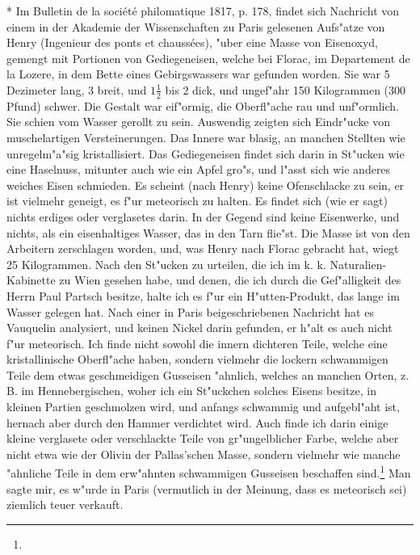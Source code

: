 \documentclass[a4paper, 11pt, oneside, polutonikogreek, german]{article}
\begin{document}
* Im Bulletin de la société philomatique 1817, p. 178, findet sich Nachricht von einem in der Akademie der Wissenschaften zu Paris gelesenen Aufs"atze von Henry (Ingenieur des ponts et chaussées), "uber eine Masse von Eisenoxyd, gemengt mit Portionen von Gediegeneisen, welche bei Florac, im Departement de la Lozere, in dem Bette eines Gebirgswassers war gefunden worden. Sie war 5 Dezimeter lang, 3 breit, und $\mathfrak{1\frac{1}{2}}$ bis 2 dick, und ungef"ahr 150 Kilogrammen (300 Pfund) schwer. Die Gestalt war eif"ormig, die Oberfl"ache rau und unf"ormlich. Sie schien vom Wasser gerollt zu sein. Auswendig zeigten sich Eindr"ucke von muschelartigen Versteinerungen. Das Innere war blasig, an manchen Stellten wie unregelm"a"sig kristallisiert. Das Gediegeneisen findet sich darin in St"ucken wie eine Haselnuss, mitunter auch wie ein Apfel gro"s, und l"asst sich wie anderes weiches Eisen schmieden. Es scheint (nach Henry) keine Ofenschlacke zu sein, er ist vielmehr geneigt, es f"ur meteorisch zu halten. Es findet sich (wie er sagt) nichts erdiges oder verglasetes darin. In der Gegend sind keine Eisenwerke, und nichts, als ein eisenhaltiges Wasser, das in den Tarn flie"st. Die Masse ist von den Arbeitern zerschlagen worden, und, was Henry nach Florac gebracht hat, wiegt 25 Kilogrammen. Nach den St"ucken zu urteilen, die ich im k. k. Naturalien-Kabinette zu Wien gesehen habe, und denen, die ich durch die Gef"alligkeit des Herrn Paul Partsch besitze, halte ich es f"ur ein H"utten-Produkt, das lange im Wasser gelegen hat. Nach einer in Paris beigeschriebenen Nachricht hat es Vauquelin analysiert, und keinen Nickel darin gefunden, er h"alt es auch nicht f"ur meteorisch. Ich finde nicht sowohl die innern dichteren Teile, welche eine kristallinische Oberfl"ache haben, sondern vielmehr die lockern schwammigen Teile dem etwas geschmeidigen Gusseisen "ahnlich, welches an manchen Orten, z. B. im Hennebergischen, woher ich ein St"uckchen solches Eisens besitze, in kleinen Partien geschmolzen wird, und anfangs schwammig und aufgebl"aht ist, hernach aber durch den Hammer verdichtet wird. Auch finde ich darin einige kleine verglasete oder verschlackte Teile von gr"ungelblicher Farbe, welche aber nicht etwa wie der Olivin der Pallas'schen Masse, sondern vielmehr wie manche "ahnliche Teile in dem erw"ahnten schwammigen Gusseisen beschaffen sind.\footnote{} Man sagte mir, es w"urde in Paris (vermutlich in der Meinung, dass es meteorisch sei) ziemlich teuer verkauft.
\end{document}
